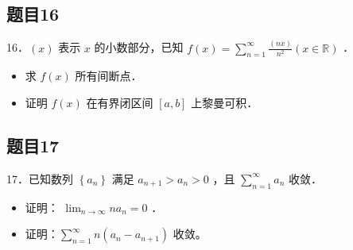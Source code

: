 \documentclass{article}
\begin{document}
\subsection{题目16}
16．\((x)\) 表示 \(x\) 的小数部分，已知 \(f(x)=\sum_{n=1}^{\infty} \frac{(n x)}{n^{2}}(x \in \mathbb{R})\) ．

\begin{itemize}
  \item[（1）] 求 \(f(x)\) 所有间断点．
  \item[（2）] 证明 \(f(x)\) 在有界闭区间 \([a, b]\) 上黎曼可积．
\end{itemize}

\subsection{题目17}
17．已知数列 \(\left\{a_{n}\right\}\) 满足 \(a_{n+1}>a_{n}>0\) ，且 \(\sum_{n=1}^{\infty} a_{n}\) 收敛．

\begin{itemize}
  \item[（1）] 证明： \(\lim _{n \rightarrow \infty} n a_{n}=0\) ．
  \item[（2）] 证明：\(\sum_{n=1}^{\infty} n\left(a_{n}-a_{n+1}\right)\) 收敛。
\end{itemize}
\end{document}
